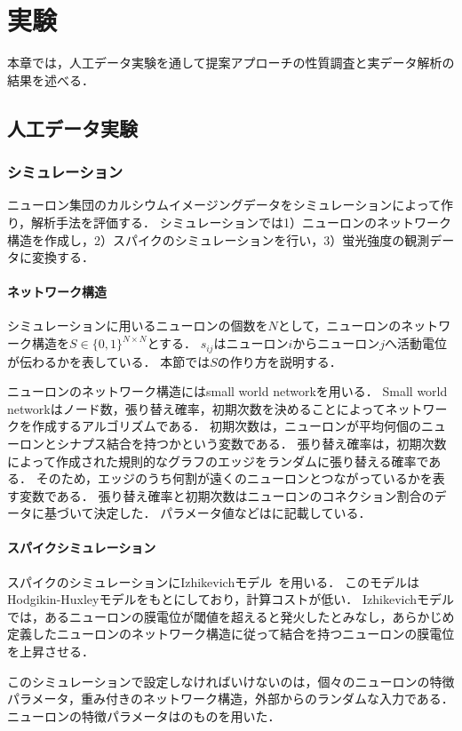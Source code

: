 \chapter{実験}
本章では，人工データ実験を通して提案アプローチの性質調査と実データ解析の結果を述べる．

\section{人工データ実験}
\subsection{シミュレーション}
ニューロン集団のカルシウムイメージングデータをシミュレーションによって作り，解析手法を評価する．
シミュレーションでは1）ニューロンのネットワーク構造を作成し，2）スパイクのシミュレーションを行い，3）蛍光強度の観測データに変換する．
\subsubsection{ネットワーク構造}
シミュレーションに用いるニューロンの個数を$N$として，ニューロンのネットワーク構造を$S \in \{0, 1\}^{N \times N}$とする．
$s_{ij}$はニューロン$i$からニューロン$j$へ活動電位が伝わるかを表している．
本節では$S$の作り方を説明する．

ニューロンのネットワーク構造にはsmall world network\cite{Watts1998}を用いる．
Small world networkはノード数，張り替え確率，初期次数を決めることによってネットワークを作成するアルゴリズムである．
初期次数は，ニューロンが平均何個のニューロンとシナプス結合を持つかという変数である．
張り替え確率は，初期次数によって作成された規則的なグラフのエッジをランダムに張り替える確率である．
そのため，エッジのうち何割が遠くのニューロンとつながっているかを表す変数である．
張り替え確率と初期次数はニューロンのコネクション割合のデータに基づいて決定した．
パラメータ値などはに記載している．

\subsubsection{スパイクシミュレーション}
スパイクのシミュレーションにIzhikevichモデル~\cite{Izhikevich2003}を用いる．
このモデルはHodgikin-Huxleyモデルをもとにしており，計算コストが低い．
Izhikevichモデルでは，あるニューロンの膜電位が閾値を超えると発火したとみなし，あらかじめ定義したニューロンのネットワーク構造に従って結合を持つニューロンの膜電位を上昇させる．

このシミュレーションで設定しなければいけないのは，個々のニューロンの特徴パラメータ，重み付きのネットワーク構造，外部からのランダムな入力である．
ニューロンの特徴パラメータは\cite{Izhikevich2003}のものを用いた．


